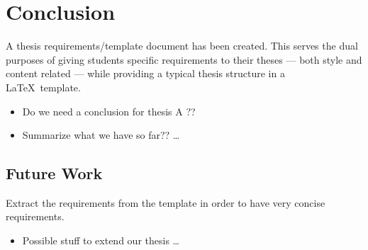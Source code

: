 \chapter{Conclusion}\label{ch:conclusion}

A thesis requirements/template document has been created.  This serves the
dual purposes of giving students specific requirements to their theses ---
both style and content related --- while providing a typical thesis
structure in a \LaTeX\ template.

\begin{itemize}
  \item Do we need a conclusion for thesis A ??
  \item Summarize what we have so far??
\ldots
\end{itemize}

\section{Future Work}

Extract the requirements from the template in order to have very concise
requirements.

\begin{itemize}
  \item Possible stuff to extend our thesis
\ldots
\end{itemize}